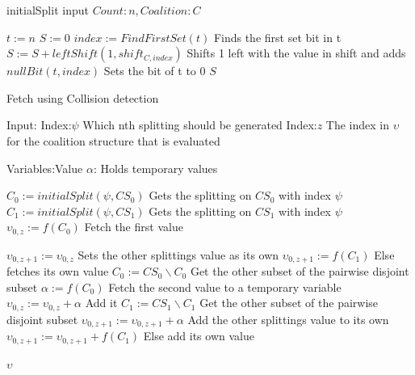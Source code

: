 \documentclass{llncs}
\begin{document}
\begin{algorithm}
\caption{initialSplit input $Count:n, Coalition:C$\label{alg:initalsplit}}
\begin{algorithmic}[1]
\STATE $t := n$
\STATE $S := 0$
 { 
\STATE $index := FindFirstSet(t)$ \hfill Finds the first set bit in t
\STATE $S := S + leftShift(1,shift_{C,index})$ \hfill Shifts 1 left with the value in shift and adds
\STATE $nullBit(t,index)$ \hfill Sets the bit of t to 0
}
\ENDWHILE
\RETURN $S$
\end{algorithmic}
\end{algorithm}

\begin{algorithm}
\caption{Fetch using Collision detection \label{collision}}
Input:
Index:$\psi$ \hfill Which nth splitting should be generated
Index:$z$ \hfill The index in $\upsilon$ for the coalition structure that is evaluated 

Variables:Value $\alpha $: \hfill Holds temporary values

\begin{algorithmic}[1]
    \STATE $C_{0} := initialSplit(\psi,CS_0)$ \label{lst:line:startcol} \hfill Gets the splitting on $CS_0$ with index $\psi$
    \STATE $C_{1} := initialSplit(\psi,CS_1)$ \hfill Gets the splitting on $CS_1$ with index $\psi$
    \STATE $\upsilon_{0,z} := f(C_{0})$ \label{lst:line:fetch} \hfill Fetch the first value
    
     \label{lst:line:firstif} 
      \STATE $\upsilon_{0,z+1} := \upsilon_{0,z}$ \hfill Sets the other splittings value as its own
      \ELSE
      \STATE $\upsilon_{0,z+1} := f(C_{1})$ \hfill Else fetches its own value
     \ENDIF \label{lst:line:firstifend}
    \STATE $C_{0} := CS_0\backslash C_{0}$ \label{lst:line:startend} \hfill Get the other subset of the pairwise disjoint subset
    \STATE $\alpha := f(C_{0})$ \hfill Fetch the second value to a temporary variable
    \STATE $\upsilon_{0,z} := \upsilon_{0,z}  + \alpha$ \label{lst:line:endend} \hfill Add it
    \STATE $C_{1} := CS_1\backslash C_{1}$ \hfill Get the other subset of the pairwise disjoint subset
      \STATE $\upsilon_{0,z+1} := \upsilon_{0,z+1}  + \alpha$ \hfill Add the other splittings value to its own
    \ELSE
      \STATE $\upsilon_{0,z+1} := \upsilon_{0,z+1} + f(C_{1})$ \hfill Else add its own value
    \ENDIF
    
\RETURN $\upsilon$
\end{algorithmic}
\end{algorithm}
\end{document}
